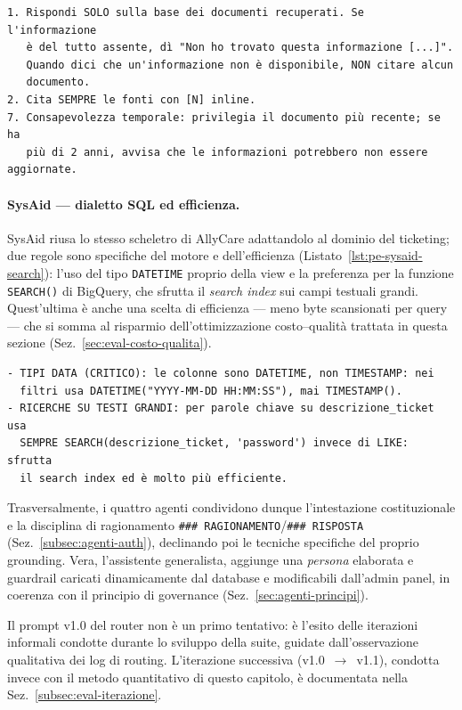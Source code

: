 \begin{lstlisting}[caption={CooPolicy: estratto delle regole non negoziabili del RAG.},label={lst:pe-coopolicy-rules}]
1. Rispondi SOLO sulla base dei documenti recuperati. Se l'informazione
   è del tutto assente, dì "Non ho trovato questa informazione [...]".
   Quando dici che un'informazione non è disponibile, NON citare alcun
   documento.
2. Cita SEMPRE le fonti con [N] inline.
7. Consapevolezza temporale: privilegia il documento più recente; se ha
   più di 2 anni, avvisa che le informazioni potrebbero non essere aggiornate.
\end{lstlisting}

\paragraph{SysAid --- dialetto SQL ed efficienza.}
SysAid riusa lo stesso scheletro di AllyCare adattandolo al dominio del
ticketing; due regole sono specifiche del motore e dell'efficienza
(Listato~\ref{lst:pe-sysaid-search}): l'uso del tipo \texttt{DATETIME}
proprio della view e la preferenza per la funzione \texttt{SEARCH()} di
BigQuery, che sfrutta il \emph{search index} sui campi testuali grandi.
Quest'ultima è anche una scelta di efficienza --- meno byte scansionati
per query --- che si somma al risparmio dell'ottimizzazione
costo--qualità trattata in questa sezione
(Sez.~\ref{sec:eval-costo-qualita}).

\begin{lstlisting}[caption={SysAid: regole di dialetto SQL ed efficienza (estratto).},label={lst:pe-sysaid-search}]
- TIPI DATA (CRITICO): le colonne sono DATETIME, non TIMESTAMP: nei
  filtri usa DATETIME("YYYY-MM-DD HH:MM:SS"), mai TIMESTAMP().
- RICERCHE SU TESTI GRANDI: per parole chiave su descrizione_ticket usa
  SEMPRE SEARCH(descrizione_ticket, 'password') invece di LIKE: sfrutta
  il search index ed è molto più efficiente.
\end{lstlisting}

Trasversalmente, i quattro agenti condividono dunque l'intestazione
costituzionale e la disciplina di ragionamento \texttt{\#\#\# RAGIONAMENTO}/\texttt{\#\#\# RISPOSTA}
(Sez.~\ref{subsec:agenti-auth}), declinando poi le tecniche specifiche
del proprio grounding. Vera, l'assistente generalista, aggiunge una
\emph{persona} elaborata e guardrail caricati dinamicamente dal database
e modificabili dall'admin panel, in coerenza con il principio di
governance (Sez.~\ref{sec:agenti-principi}).

Il prompt v1.0 del router non è un primo tentativo: è l'esito delle
iterazioni informali condotte durante lo sviluppo della suite, guidate
dall'osservazione qualitativa dei log di routing. L'iterazione
successiva (v1.0~$\rightarrow$~v1.1), condotta invece con il metodo
quantitativo di questo capitolo, è documentata nella
Sez.~\ref{subsec:eval-iterazione}.

